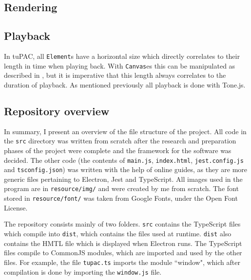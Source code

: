 \documentclass[12pt,a4paper,twoside,openright]{report}
\newcommand{\element}{\texttt{Element}}
\newcommand{\canvas}{\texttt{Canvas}}
\begin{document}
\subsection{Rendering}
\subsection{Playback}
In tuPAC, all \element s have a horizontal size which directly correlates to their length in time when playing back. With \canvas es this can be manipulated as described in , but it is imperative that this length always correlates to the duration of playback. As mentioned previously all playback is done with Tone.js. 

\subsection{Repository overview}
In summary, I present an overview of the file structure of the project. All code in the \verb|src| directory was written from scratch after the research and preparation phases of the project were complete and the framework for the software was decided. The other code (the contents of \verb|main.js|, \verb|index.html|, \verb|jest.config.js| and \verb|tsconfig.json|) was written with the help of online guides, as they are more generic files pertaining to Electron, Jest and TypeScript. All images used in the program are in \verb|resource/img/| and were created by me from scratch. The font stored in \verb|resource/font/| was taken from Google Fonts, under the Open Font License.

\DTsetlength{0.2em}{1em}{0.2em}{0.4pt}{2pt}
\setlength{\DTbaselineskip}{20pt}

The repository consists mainly of two folders. \verb|src| contains the TypeScript files which compile into \verb|dist|, which contains the files used at runtime. \verb|dist| also contains the HMTL file which is displayed when Electron runs. The TypeScript files compile to CommonJS modules, which are imported and used by the other files. For example, the file \verb|tupac.ts| imports the module ``window", which after compilation is done by importing the \verb|window.js| file.
\end{document}

